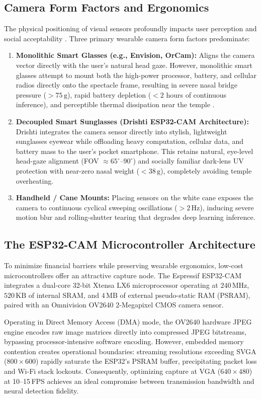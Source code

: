 \documentclass[10pt,twocolumn]{article}
\begin{document}
\subsection{Camera Form Factors and Ergonomics}
The physical positioning of visual sensors profoundly impacts user perception and social acceptability \cite{profita2013don}. Three primary wearable camera form factors predominate:
\begin{enumerate}[leftmargin=*]
    \item \textbf{Monolithic Smart Glasses (e.g., Envision, OrCam):} Aligns the camera vector directly with the user's natural head gaze. However, monolithic smart glasses attempt to mount both the high-power processor, battery, and cellular radios directly onto the spectacle frame, resulting in severe nasal bridge pressure ($>75\,\text{g}$), rapid battery depletion ($<2$ hours of continuous inference), and perceptible thermal dissipation near the temple \cite{mann2001wearable}.
    \item \textbf{Decoupled Smart Sunglasses (Drishti ESP32-CAM Architecture):} Drishti integrates the camera sensor directly into stylish, lightweight sunglasses eyewear while offloading heavy computation, cellular data, and battery mass to the user's pocket smartphone. This retains natural, eye-level head-gaze alignment (FOV $\approx 65^\circ$--$90^\circ$) and socially familiar dark-lens UV protection with near-zero nasal weight ($<38\,\text{g}$), completely avoiding temple overheating.
    \item \textbf{Handheld / Cane Mounts:} Placing sensors on the white cane exposes the camera to continuous cyclical sweeping oscillations ($>2\,\text{Hz}$), inducing severe motion blur and rolling-shutter tearing that degrades deep learning inference.
\end{enumerate}

\subsection{The ESP32-CAM Microcontroller Architecture}
To minimize financial barriers while preserving wearable ergonomics, low-cost microcontrollers offer an attractive capture node. The Espressif ESP32-CAM integrates a dual-core 32-bit Xtensa LX6 microprocessor operating at $240\,\text{MHz}$, $520\,\text{KB}$ of internal SRAM, and $4\,\text{MB}$ of external pseudo-static RAM (PSRAM), paired with an Omnivision OV2640 2-Megapixel CMOS camera sensor.

Operating in Direct Memory Access (DMA) mode, the OV2640 hardware JPEG engine encodes raw image matrices directly into compressed JPEG bitstreams, bypassing processor-intensive software encoding. However, embedded memory contention creates operational boundaries: streaming resolutions exceeding SVGA ($800 \times 600$) rapidly saturate the ESP32's PSRAM buffer, precipitating packet loss and Wi-Fi stack lockouts. Consequently, optimizing capture at VGA ($640 \times 480$) at 10--15\,FPS achieves an ideal compromise between transmission bandwidth and neural detection fidelity.
\end{document}
